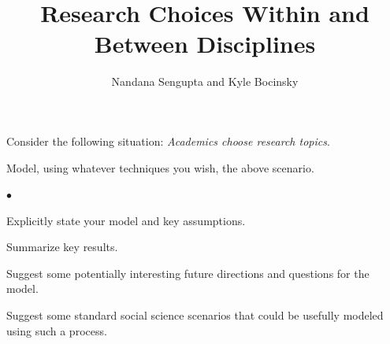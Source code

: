 \documentclass[letterpaper]{article} %
\title{Research Choices Within and Between Disciplines}
\author{Nandana Sengupta and Kyle Bocinsky}
\newenvironment{list1}{
  \begin{list}{\ding{113}}{%
      \setlength{\itemsep}{0in}
      \setlength{\parsep}{0in} \setlength{\parskip}{0in}
      \setlength{\topsep}{0in} \setlength{\partopsep}{0in} 
      \setlength{\leftmargin}{0.17in}}}{\end{list}}
\newenvironment{list2}{
  \begin{list}{$\bullet$}{%
      \setlength{\itemsep}{0in}
      \setlength{\parsep}{0in} \setlength{\parskip}{0in}
      \setlength{\topsep}{0in} \setlength{\partopsep}{0in} 
      \setlength{\leftmargin}{0.2in}}}{\end{list}}
\begin{document}
\maketitle
Consider the following situation: \emph{Academics choose research topics}.

\begin{list1}
\item[] Model, using whatever techniques you wish, the above scenario.
\begin{list2}
\item[] Explicitly state your model and key assumptions. %
\item[] Summarize key results.
\item[] Suggest some potentially interesting future directions and questions for the model.
\end{list2}
\item[] Suggest some standard social science scenarios that could be usefully modeled using such a process.
\end{list1}
\end{document}
